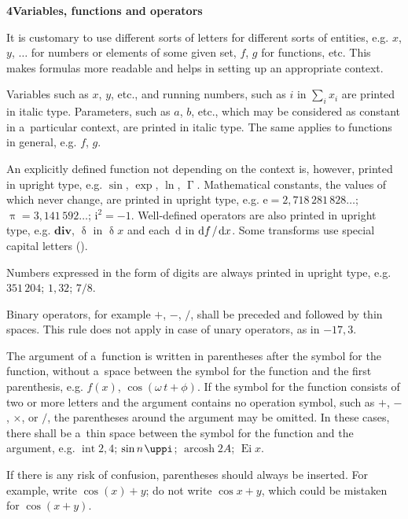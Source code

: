 \documentclass[12pt, a4paper, oneside]{article}
\newlength{\smalllinespacing}
\renewenvironment{quotation}{%
	\list{}{%
		\leftmargin = \baselineskip%
		\rightmargin = \leftmargin%
		\listparindent = \smalllinespacing%
		\parsep = 0pt%
		\baselineskip = \smalllinespacing%
	}%
	\item\relax%
}{%
	\endlist%
}
\newcommand{\dd}{\mathrm{d}}
\newcommand*{\divslash}{%
	\mathbin{%
		\nonscript\mskip-2mu / \nonscript\mskip-2mu%
	}%
}  %
\theoremstyle{Plain}
\theoremstyle{Definition}
\theoremstyle{Remark}
\begin{document}
\begin{quotation}
	\sloppy%
	\textbf{4\quad Variables, functions and operators}\par{}\baselineskip
	\noindent It is customary to use different sorts of letters for different sorts of entities, e.g. $x$, $y$, $\dots$ for numbers or elements of some given set, $f$, $g$ for functions, etc. This makes formulas more readable and helps in setting up an appropriate context. \par
	Variables such as $x$, $y$, etc., and running numbers, such as $i$ in $\sum_i x_i$ are printed in italic type. Parameters, such as $a$, $b$, etc., which may be considered as constant in a~particular context, are printed in italic type. The same applies to functions in general, e.g. $f$, $g$. \par
	An explicitly defined function not depending on the context is, however, printed in upright type, e.g. $\sin$, $\exp$, $\ln$, $\upGamma$. Mathematical constants, the values of which never change, are printed in upright type, e.g. ${\mathrm{e} = 2{,}718\,281\,828\dots}$; ${\uppi = 3{,}141\,592\dots}$; ${\mathrm{i}^2 = -1}$. Well-defined operators are also printed in upright type, e.g. $\mathbf{div}$, $\updelta$ in $\updelta x$ and each~$\dd$ in ${\dd f \divslash \dd x}$. Some transforms use special capital letters (\textellipsis\!). \par
	Numbers expressed in the form of digits are always printed in upright type, e.g. $351\,204$; $1{,}32$; $7/8$. \par
	Binary operators, for example $+$, $-$, $/$, shall be preceded and followed by thin spaces. This rule does not apply in case of unary operators, as in $-17{,}3$. \par
	The argument of a~function is written in parentheses after the symbol for the function, without a~space between the symbol for the function and the first parenthesis, e.g. $f(x)$, ${\cos(\omega\,t + \phi)}$. If the symbol for the function consists of two or more letters and the argument contains no operation symbol, such as $+$, $-$, $\times$, or $/$, the parentheses around the argument may be omitted. In these cases, there shall be a~thin space between the symbol for the function and the argument, e.g. $\operatorname{int} 2{,}4$; $\sin n{\kern 0.1em}\uppi$; $\operatorname{arcosh} 2A$; $\operatorname{Ei} x$. \par
	If there is any risk of confusion, parentheses should always be inserted. For example, write $\cos(x) + y$; do not write $\cos x + y$, which could be mistaken for $\cos(x + y)$. \par

\end{quotation}
\end{document}
